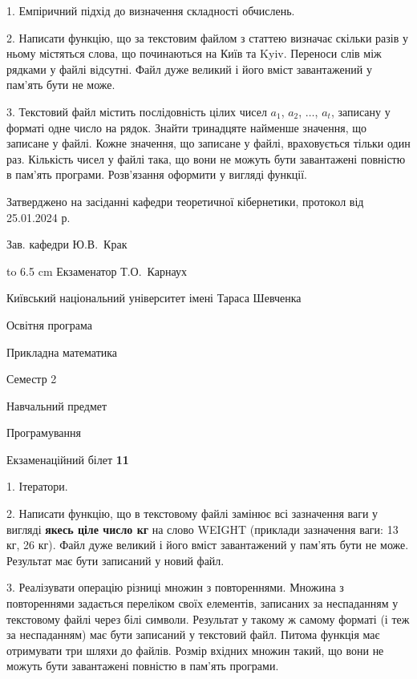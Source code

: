 \documentclass[12pt, ukrainian]{article}
\begin{document}
{%
1. Емпіричний підхід до визначення складності обчислень.%
\par
2. Написати функцію, що за текстовим файлом з статтею визначає скільки разів у ньому містяться слова, що починаються на Київ та Kyiv.  Переноси слів між рядками у файлі відсутні. Файл дуже великий і його вміст завантажений у пам'ять бути не може.

\par
3. Текстовий файл містить послідовність цілих чисел $a_1$, $a_2$, $\ldots$, $a_t$, записану у форматі одне число на рядок. Знайти тринадцяте найменше значення, що записане у файлі. Кожне значення, що записане у файлі, враховується тільки один раз. Кількість чисел у файлі така, що вони не можуть бути завантажені повністю в пам'ять програми. Розв'язання оформити у вигляді функції.

}
{\smallskip\smallskip \begin {scriptsize} Затверджено на засіданні кафедри теоретичної кібернетики, протокол   від   25.01.2024 р.\par\smallskip\smallskip\smallskip\smallskip
{\parbox {6.5 cm} {Зав. кафедри \dotfill Ю.В.~Крак}}\hspace {0.7cm} {\hbox to 6.5 cm { Екзаменатор \dotfill Т.О.~Карнаух}} \end{scriptsize}}
\vspace{0.9cm}
{{\begin {scriptsize}\par
{ \center  Київський національний університет імені Тараса Шевченка \par}
{\parbox {5 cm}{Освітня програма \hfill}{\parbox {7 cm}{Прикладна математика\hfill}}\parbox {6 cm}{\hfill Семестр 2}}\par
{\parbox {5 cm} {Навчальний предмет \hfill}\parbox {7 cm}{Програмування \hfill}\parbox {6cm}{\hfill}\par}\vspace{-15pt} \end{scriptsize}}{\center Екзаменаційний білет \No \textbf { 11 }\par}}
{%
1. Ітератори.%
\par
2. Написати функцію, що в текстовому файлі замінює всі зазначення ваги у вигляді \textbf{якесь ціле число кг} на слово WEIGHT (приклади зазначення ваги: 13 кг, 26   кг). Файл дуже великий і його вміст завантажений у пам'ять бути не може. Результат має бути записаний у новий файл.

\par
3. Реалізувати операцію різниці множин з повтореннями. Множина з повтореннями задається переліком своїх елементів, записаних за неспаданням у текстовому файлі через білі символи. Результат у такому ж самому форматі (і теж за неспаданням) має бути записаний у текстовий файл. Питома функція має отримувати три шляхи до файлів. Розмір вхідних множин такий, що вони не можуть бути завантажені повністю в пам’ять програми.

}
\end{document}
